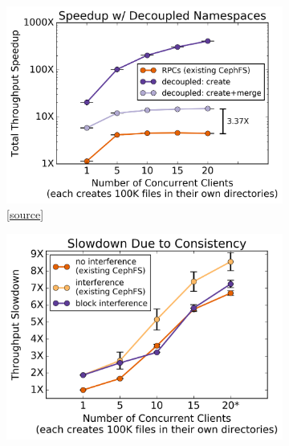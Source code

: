 
\begin{figure}[tb]
  \centering
  \begin{subfigure}[b]{.3\linewidth}
      \centering
      \includegraphics[width=1.0\linewidth]{./chapters/cudele/figures/mergescale.png}
      \caption{
      [\href{https://github.com/michaelsevilla/cudele-popper/blob/master/experiments/cudele-mergescale/visualize/viz.ipynb}{source}]
      }\label{fig:mergescale}
  \end{subfigure}
  \begin{subfigure}[b]{.3\linewidth}
      \centering
      \includegraphics[width=1.0\linewidth]{./chapters/cudele/figures/block-allow.png}

\end{subfigure}
\end{figure}
